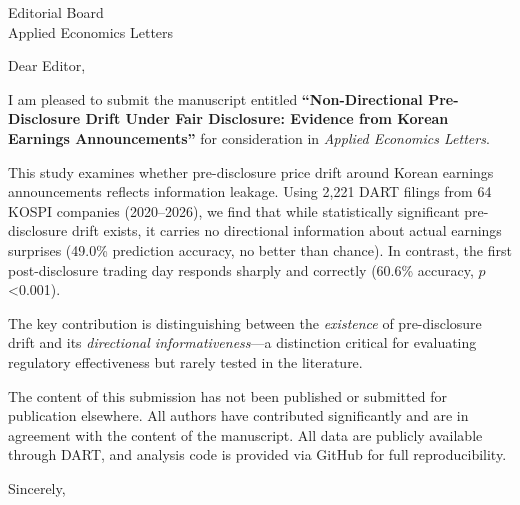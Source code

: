 \documentclass[12pt]{letter}
\begin{document}
\begin{letter}{Editorial Board \\ Applied Economics Letters}

\opening{Dear Editor,}

I am pleased to submit the manuscript entitled \textbf{``Non-Directional Pre-Disclosure Drift Under Fair Disclosure: Evidence from Korean Earnings Announcements''} for consideration in \textit{Applied Economics Letters}.

This study examines whether pre-disclosure price drift around Korean earnings announcements reflects information leakage. Using 2,221 DART filings from 64 KOSPI companies (2020--2026), we find that while statistically significant pre-disclosure drift exists, it carries no directional information about actual earnings surprises (49.0\% prediction accuracy, no better than chance). In contrast, the first post-disclosure trading day responds sharply and correctly (60.6\% accuracy, $p$<0.001).

The key contribution is distinguishing between the \textit{existence} of pre-disclosure drift and its \textit{directional informativeness}---a distinction critical for evaluating regulatory effectiveness but rarely tested in the literature.

The content of this submission has not been published or submitted for publication elsewhere. All authors have contributed significantly and are in agreement with the content of the manuscript. All data are publicly available through DART, and analysis code is provided via GitHub for full reproducibility.

\closing{Sincerely,}

\signature{Yongjun Kim\\Department of Software\\Ajou University\\Suwon, South Korea\\yjkim0123@ajou.ac.kr}

\end{letter}
\end{document}
